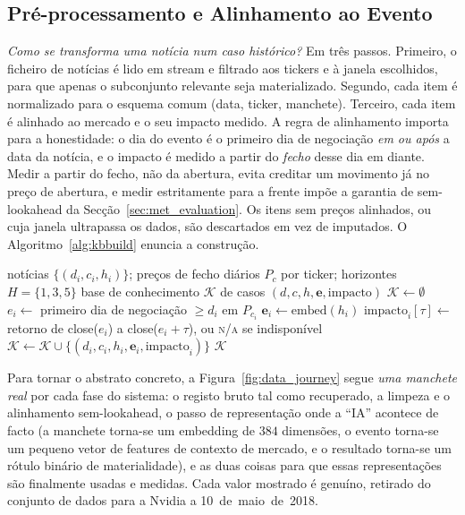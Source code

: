 \subsection{Pré-processamento e Alinhamento ao Evento}
\label{sec:met_data_prep}

\emph{Como se transforma uma notícia num caso histórico?} Em três passos. Primeiro, o ficheiro de notícias
é lido em stream e filtrado aos tickers e à janela escolhidos, para que apenas o subconjunto relevante seja
materializado. Segundo, cada item é normalizado para o esquema comum (data, ticker, manchete). Terceiro,
cada item é alinhado ao mercado e o seu impacto medido. A regra de alinhamento importa para a honestidade: o
dia do evento é o primeiro dia de negociação \emph{em ou após} a data da notícia, e o impacto é medido a
partir do \emph{fecho} desse dia em diante. Medir a partir do fecho, não da abertura, evita creditar um
movimento já no preço de abertura, e medir estritamente para a frente impõe a garantia de sem-lookahead da
Secção~\ref{sec:met_evaluation}. Os itens sem preços alinhados, ou cuja janela ultrapassa os dados, são
descartados em vez de imputados. O Algoritmo~\ref{alg:kbbuild} enuncia a construção.

\begin{algorithm}[ht]
\caption{Construção da base de conhecimento com alinhamento ao evento.}
\label{alg:kbbuild}
\begin{algorithmic}[1]
\Require notícias $\{(d_i,c_i,h_i)\}$; preços de fecho diários $P_c$ por ticker; horizontes $H=\{1,3,5\}$
\Ensure base de conhecimento $\mathcal{K}$ de casos $(d,c,h,\mathbf{e},\text{impacto})$
\State $\mathcal{K} \gets \emptyset$
  \State $e_i \gets$ primeiro dia de negociação $\ge d_i$ em $P_{c_i}$ 
    \State $\mathbf{e}_i \gets \mathrm{embed}(h_i)$ 
      \State $\text{impacto}_i[\tau] \gets$ retorno de close($e_i$) a close($e_i{+}\tau$), ou \textsc{n/a} se indisponível
    \EndFor
    \State $\mathcal{K} \gets \mathcal{K} \cup \{(d_i,c_i,h_i,\mathbf{e}_i,\text{impacto}_i)\}$
  \EndIf
\EndFor
\State \Return $\mathcal{K}$
\end{algorithmic}
\end{algorithm}

Para tornar o abstrato concreto, a Figura~\ref{fig:data_journey} segue \emph{uma manchete real} por cada
fase do sistema: o registo bruto tal como recuperado, a limpeza e o alinhamento sem-lookahead, o passo de
representação onde a ``IA'' acontece de facto (a manchete torna-se um embedding de $384$ dimensões, o evento
torna-se um pequeno vetor de features de contexto de mercado, e o resultado torna-se um rótulo binário de
materialidade), e as duas coisas para que essas representações são finalmente usadas e medidas. Cada valor
mostrado é genuíno, retirado do conjunto de dados para a Nvidia a 10~de~maio~de~2018.

